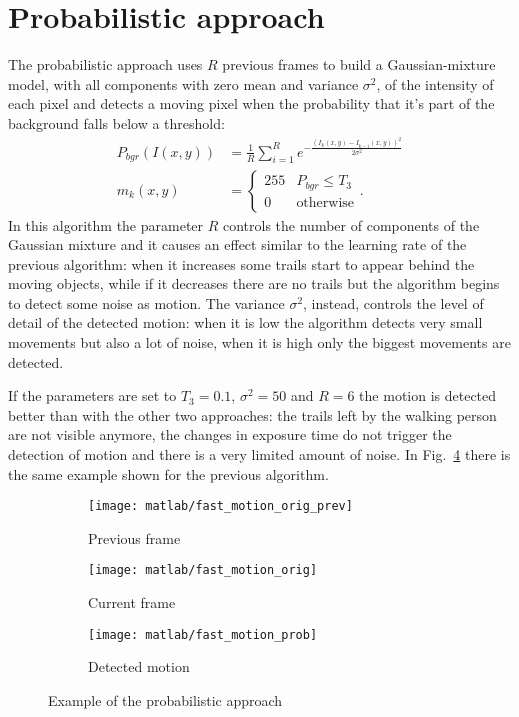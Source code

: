 \documentclass[a4paper,oneside]{article}
\begin{document}
\section*{Probabilistic approach}
The probabilistic approach uses $R$ previous frames to build a
Gaussian-mixture model, with all components with zero mean and
variance $\sigma^2$, of the intensity of each pixel and detects a
moving pixel when the probability that it's part of the background
falls below a threshold:
\begin{align}
  P_{bgr}(I(x,y)) &= \frac{1}{R} \sum_{i=1}^R e^{-\frac{(I_k(x,y)-I_{k-i}(x,y))^2}{2\sigma^2}} \\
  m_k(x,y) &= \begin{cases}
    255  & P_{bgr} \leq T_3 \\
    0  & \text{otherwise}
    \end{cases} . 
\end{align}
In this algorithm the parameter $R$ controls the number of components
of the Gaussian mixture and it causes an effect similar to the
learning rate of the previous algorithm: when it increases some trails
start to appear behind the moving objects, while if it decreases there
are no trails but the algorithm begins to detect some noise as
motion. The variance $\sigma^2$, instead, controls the level of detail
of the detected motion: when it is low the algorithm detects very
small movements but also a lot of noise, when it is high only the
biggest movements are detected.

If the parameters are set to $T_3 = 0.1$, $\sigma^2 = 50$ and $R=6$
the motion is detected better than with the other two approaches: the
trails left by the walking person are not visible anymore, the changes
in exposure time do not trigger the detection of motion and there is a
very limited amount of noise. In Fig.~\ref{fig:prob} there is the same
example shown for the previous algorithm.
\begin{figure}[htbp]
  \centering
  \begin{subfigure}{0.3\textwidth}
    \centering
    \texttt{[image: matlab/fast\_motion\_orig\_prev]}
    \caption{Previous frame}
    \label{fig:prob_orig_prev}
  \end{subfigure}%
  \begin{subfigure}{0.3\textwidth}
    \centering
    \texttt{[image: matlab/fast\_motion\_orig]}
    \caption{Current frame}
    \label{fig:prob_orig}
  \end{subfigure}%
  \begin{subfigure}{0.3\textwidth}
    \centering
    \texttt{[image: matlab/fast\_motion\_prob]}
    \caption{Detected motion}
    \label{fig:prob}
  \end{subfigure}%
  \caption{Example of the probabilistic approach}
\end{figure}
\end{document}
